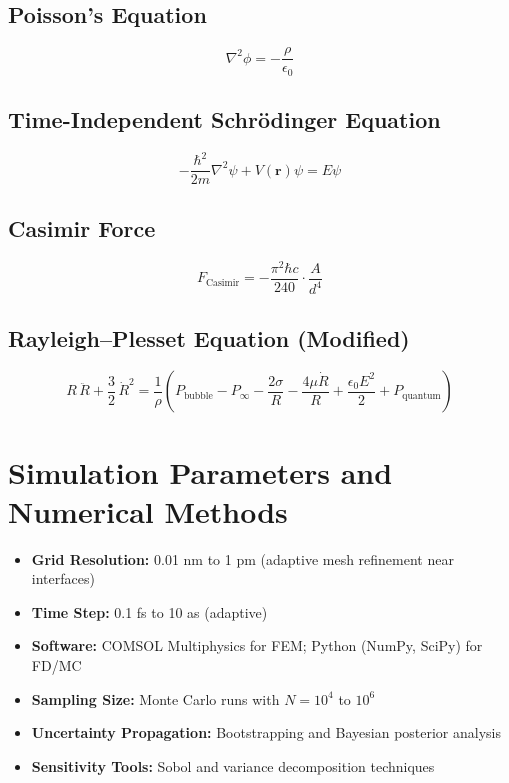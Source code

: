     \subsection*{Poisson's Equation}
    \[
    \nabla^2 \phi = -\frac{\rho}{\epsilon_0}
    \]
    
    \subsection*{Time-Independent Schrödinger Equation}
    \[
    -\frac{\hbar^2}{2m} \nabla^2 \psi + V(\mathbf{r}) \psi = E \psi
    \]
    
    \subsection*{Casimir Force}
    \[
    F_{\text{Casimir}} = -\frac{\pi^2 \hbar c}{240} \cdot \frac{A}{d^4}
    \]
    
    \subsection*{Rayleigh–Plesset Equation (Modified)}
    \[
    R\,\ddot{R} + \frac{3}{2}\,\dot{R}^2 = \frac{1}{\rho}\left(P_{\text{bubble}} - P_{\infty} - \frac{2\sigma}{R} - \frac{4\mu \dot{R}}{R} + \frac{\epsilon_0 E^2}{2} + P_{\text{quantum}}\right)
    \]
    
    \section{Simulation Parameters and Numerical Methods}
    
    \begin{itemize}
        \item \textbf{Grid Resolution:} 0.01 nm to 1 pm (adaptive mesh refinement near interfaces)
        \item \textbf{Time Step:} 0.1 fs to 10 as (adaptive)
        \item \textbf{Software:} COMSOL Multiphysics for FEM; Python (NumPy, SciPy) for FD/MC
        \item \textbf{Sampling Size:} Monte Carlo runs with $N = 10^4$ to $10^6$
        \item \textbf{Uncertainty Propagation:} Bootstrapping and Bayesian posterior analysis
        \item \textbf{Sensitivity Tools:} Sobol and variance decomposition techniques
    \end{itemize}
    
